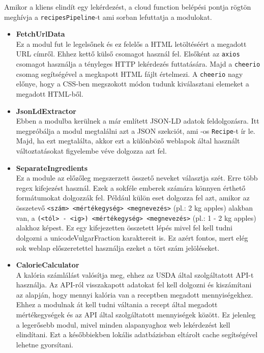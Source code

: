 \documentclass[12pt]{report}
\theoremstyle{definition}
\begin{document}
Amikor a kliens elindít egy lekérdezést, a cloud function belépési pontja rögtön meghívja a \verb+recipesPipeline+-t ami sorban lefuttatja a modulokat.


\begin{itemize}
	\item \textbf{FetchUrlData} \\
	Ez a modul fut le legelsőnek és ez felelős a HTML letöltéséért a megadott URL címről. Ehhez kettő külső csomagot használ fel.
	Elsőként az \verb+axios+ csomagot használja a tényleges \Gls{HTTP} lekérdezés futtatására. Majd a \verb+cheerio+ csomag segítségével a megkapott HTML fájlt értelmezi. 
	A \verb+cheerio+ nagy előnye, hogy a CSS-ben megszokott módon tudunk kiválasztani elemeket a megadott HTML-ből. 

	\item \textbf{JsonLdExtractor} \\
	Ebben a modulba kerülnek a már említett JSON-LD adatok feldolgozásra. Itt megpróbálja a modul megtalálni azt a \Gls{JSON} szekciót, ami -os  \verb+Recipe+-t ír le.
	Majd, ha ezt megtalálta, akkor ezt a különböző weblapok által használt változtatásokat figyelembe véve dolgozza azt fel. 

	\item \textbf{SeparateIngredients} \\
	Ez a module az előzőleg megszerzett összető neveket választja szét. Erre több \Gls{regex} kifejezést használ. Ezek a sokféle emberek számára könnyen érthető formátumokat dolgozzák fel. 
	Például külön eset dolgozza fel azt, amikor az összetevő \texttt{<szám> <mértékegység> <megnevezés>} (pl.: 2 kg apples) alakban van, a \texttt{(<tól> - <ig>) <mértékegység> <megnevezés>} (pl.: 1 - 2 kg apples) alakhoz képest. 
	Ez egy kifejezetten  összetett lépés mivel fel kell tudni dolgozni a \Gls{unicodeVulgarFraction} karaktereit is. Ez azért fontos, mert elég sok weblap előszeretettel használja ezeket a tört szám jelöléseket.

	\item \textbf{CalorieCalculator} \\
	A kalória számlálást valósítja meg, ehhez az \Gls{USDA} által szolgáltatott \Gls{API}-t használja. 
	Az API-ról visszakapott adatokat fel kell dolgozni és kiszámítani az alapján, hogy mennyi kalória van a receptben megadott mennyiségekhez. 
	Ehhez a modulnak át kell tudni váltania a recept által megadott mértékegységek és az API által szolgáltatott mennyiségek között. 
	Ez jelenleg a legerősebb modul, mivel minden alapanyaghoz web lekérdezést kell elindítani. Ezt a későbbiekben lokális adatbázisban eltárolt \gls{cache} segítségével lehetne gyorsítani.

\end{itemize}
\end{document}
